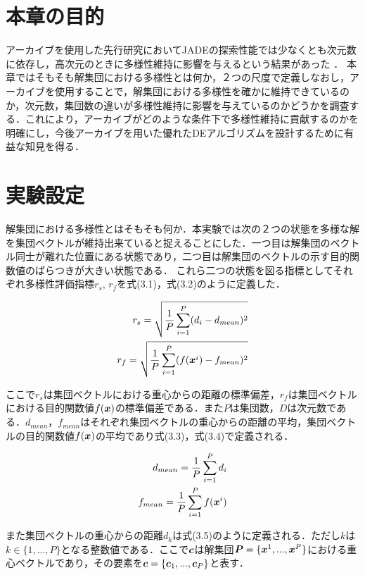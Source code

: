 \documentclass[a4paper,11pt,oneside,openany]{jsbook}
\def\vector#1{\mbox{\boldmath $#1$}}
\begin{document}
\section{本章の目的}
アーカイブを使用した先行研究においてJADEの探索性能では少なくとも次元数に依存し，高次元のときに多様性維持に影響を与えるという結果があった \cite{JADE} ．
本章ではそもそも解集団における多様性とは何か，２つの尺度で定義しなおし，アーカイブを使用することで，解集団における多様性を確かに維持できているのか，次元数，集団数の違いが多様性維持に影響を与えているのかどうかを調査する．これにより，アーカイブがどのような条件下で多様性維持に貢献するのかを明確にし，今後アーカイブを用いた優れたDEアルゴリズムを設計するために有益な知見を得る．

\section{実験設定}
解集団における多様性とはそもそも何か．本実験では次の２つの状態を多様な解を集団ベクトルが維持出来ていると捉えることにした．一つ目は解集団のベクトル同士が離れた位置にある状態であり，二つ目は解集団のベクトルの示す目的関数値のばらつきが大きい状態である．
これら二つの状態を図る指標としてそれぞれ多様性評価指標$r_s$, $r_f$を式(3.1)，式(3.2)のように定義した．

\begin{eqnarray}
r_{s} = \sqrt{\frac{1}{P}\sum_{i=1}^{P} (d_i - d_{mean})^2} \\
r_{f} = \sqrt{\frac{1}{P}\sum_{i=1}^{P} (f(\vector{x}^i) - f_{mean})^2}
\end{eqnarray}

ここで$r_s$は集団ベクトルにおける重心からの距離の標準偏差，$r_f$は集団ベクトルにおける目的関数値$f(\vector{x})$の標準偏差である．また$P$は集団数，$D$は次元数である．$d_{mean}$，$f_{mean}$はそれぞれ集団ベクトルの重心からの距離の平均，集団ベクトルの目的関数値$f(\vector{x})$の平均であり式(3.3)，式(3.4)で定義される．

\begin{eqnarray}
d_{mean} = \frac{1}{P}\sum_{i=1}^{P}d_i \\
f_{mean} = \frac{1}{P}\sum_{i=1}^{P}f(\vector{x}^i)
\end{eqnarray}

また集団ベクトルの重心からの距離$d_k$は式(3.5)のように定義される．ただし$k$は$k \in \{1, ..., P\}$となる整数値である．ここで$\vector{c}$は解集団$\vector{P} = \{ \vector{x}^{1}, ..., \vector{x}^{P} \}$における重心ベクトルであり，その要素を$\vector{c} = \{ \vector{c}_{1}, ..., \vector{c}_{P} \}$と表す．
\end{document}

